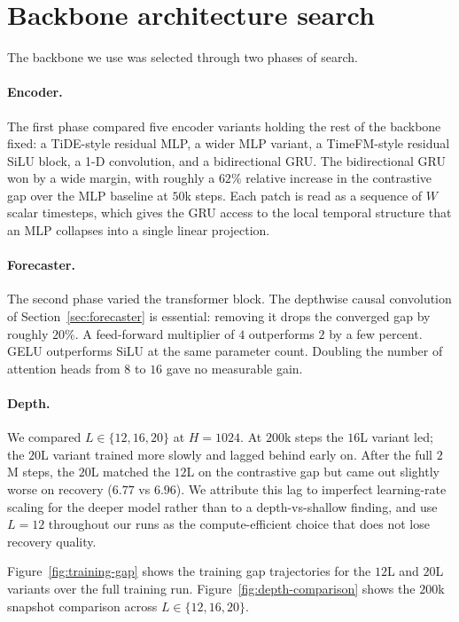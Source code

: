\section{Backbone architecture search}
\label{sec:appendix-backbone-search}

The backbone we use was selected through two phases of search.

\paragraph{Encoder.} The first phase compared five encoder variants
holding the rest of the backbone fixed: a TiDE-style residual MLP, a
wider MLP variant, a TimeFM-style residual SiLU block, a 1-D
convolution, and a bidirectional GRU. The bidirectional GRU won by a
wide margin, with roughly a $62\%$ relative increase in the
contrastive gap over the MLP baseline at $50$k steps. Each patch is
read as a sequence of $W$ scalar timesteps, which gives the GRU
access to the local temporal structure that an MLP collapses into a
single linear projection.

\paragraph{Forecaster.} The second phase varied the transformer
block. The depthwise causal convolution of Section~\ref{sec:forecaster}
is essential: removing it drops the converged gap by roughly $20\%$. A
feed-forward multiplier of $4$ outperforms $2$ by a few percent. GELU
outperforms SiLU at the same parameter count. Doubling the number of
attention heads from $8$ to $16$ gave no measurable gain.

\paragraph{Depth.} We compared $L \in \{12, 16, 20\}$ at $H = 1024$.
At $200$k steps the $16$L variant led; the $20$L variant trained more
slowly and lagged behind early on. After the full $2$M steps, the
$20$L matched the $12$L on the contrastive gap but came out slightly
worse on recovery ($6.77$ vs $6.96$). We attribute this lag to
imperfect learning-rate scaling for the deeper model rather than to a
depth-vs-shallow finding, and use $L = 12$ throughout our runs as
the compute-efficient choice that does not lose recovery quality.

Figure~\ref{fig:training-gap} shows the training gap trajectories for
the $12$L and $20$L variants over the full training run.
Figure~\ref{fig:depth-comparison} shows the $200$k snapshot
comparison across $L \in \{12, 16, 20\}$.

